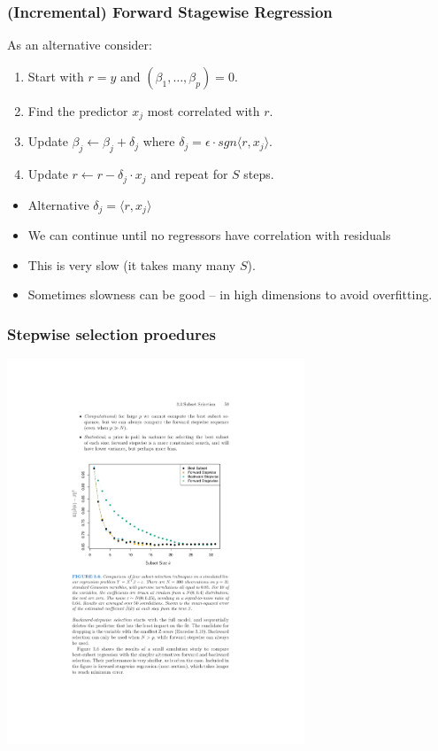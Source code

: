 \documentclass[xcolor=pdftex,dvipsnames,table,mathserif,aspectratio=169]{beamer}
\begin{document}
\begin{frame}
\frametitle{(Incremental) Forward Stagewise Regression}
As an alternative consider:
\begin{enumerate}
\item Start with $r= y$ and $(\beta_1, \ldots, \beta_p) = 0$.
\item Find the predictor $x_j$ most correlated with $r$.
\item Update $\beta_j \leftarrow \beta_j + \delta_j$ where $\delta_j = \epsilon \cdot sgn \langle r , x_j \rangle$.
\item Update $r \leftarrow r - \delta_j \cdot x_j$ and repeat for $S$ steps.
\end{enumerate}
\begin{itemize}
\item Alternative $\delta_j =  \langle r , x_j \rangle$
\item We can continue until no regressors have correlation with residuals 
\item This is very slow (it takes many many $S$).
\item Sometimes slowness can be good -- in high dimensions to avoid overfitting.
\end{itemize}
\end{frame}



\begin{frame}
\frametitle{Stepwise selection proedures}
\begin{center}
\includegraphics[width=3.5in]{./resources/subsetstepwise}
\end{center}
\end{frame}
\end{document}
